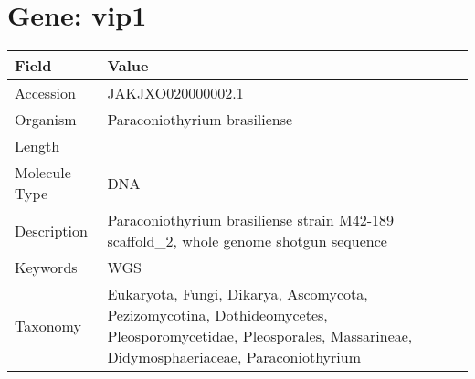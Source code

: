 \documentclass[10pt]{article}
\begin{document}
\section{Gene: vip1}
{\footnotesize
\begin{longtable}{>{\raggedright\arraybackslash}p{4.5cm} >{\raggedright\arraybackslash}p{11.5cm}}
\textbf{Field} & \textbf{Value} \\
\hline
Accession & JAKJXO020000002.1 \\
Organism & Paraconiothyrium brasiliense \\
Length & 3244158 \\
Molecule Type & DNA \\
Description & Paraconiothyrium brasiliense strain M42-189 scaffold\_2, whole genome shotgun sequence \\
Keywords & WGS \\
Taxonomy & Eukaryota, Fungi, Dikarya, Ascomycota, Pezizomycotina, Dothideomycetes, Pleosporomycetidae, Pleosporales, Massarineae, Didymosphaeriaceae, Paraconiothyrium \\
\end{longtable}
}

\vspace{1em}
\end{document}

